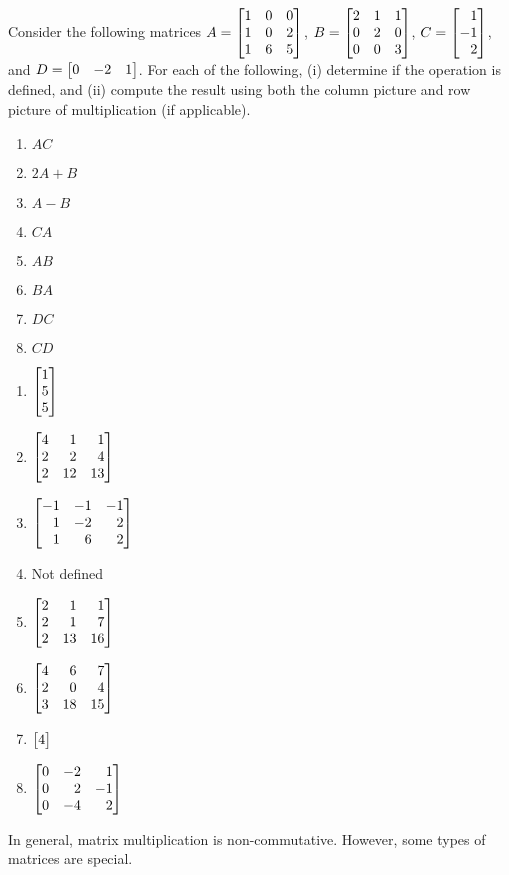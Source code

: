 \begin{exercises}
\begin{problist}
\begin{solution}
\begin{enumerate}
			\end{enumerate}
		\end{solution}
		\prob Consider the following matrices
		$A=\mat{1 & 0 & 0 \\ 1 & 0 & 2 \\ 1 & 6 & 5}$, $B=\mat{2 & 1 & 1 \\ 0 & 2 & 0 \\ 0 & 0 & 3}$,
		$C=\mat{1\\-1\\2}$, and $D=\mat{0&-2&1}$. For each of the following, (i) determine if the operation
		is defined, and (ii) compute the result using both the column picture
		and row picture of multiplication (if applicable).
		\begin{enumerate}
			\item $AC$
			\item $2A+B$
			\item $A-B$
			\item $CA$
			\item $AB$
			\item $BA$
			\item $DC$
			\item $CD$
		\end{enumerate}
		\begin{solution}
			\begin{enumerate}
				\item $\mat{1\\5\\5}$
				\item $\mat{4&1&1\\2&2&4\\2&12&13}$
				\item $\mat{-1&-1&-1\\1&-2&2\\1&6&2}$
				\item Not defined
				\item $\mat{2&1&1\\2&1&7\\2&13&16}$
				\item $\mat{4&6&7\\2&0&4\\3&18&15}$
				\item $\mat{4}$
				\item $\mat{0&-2&1\\0&2&-1\\0&-4&2}$
			\end{enumerate}
		\end{solution}
		\prob In general, matrix multiplication is non-commutative. However, some types of matrices are special.


\end{problist}
\end{exercises}
